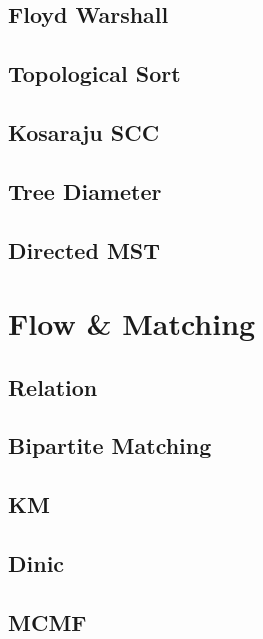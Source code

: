     \subsection{Floyd Warshall}
        
    \subsection{Topological Sort}
        
    \subsection{Kosaraju SCC}
        
    \subsection{Tree Diameter}
        
    \subsection{Directed MST}
        

\section{Flow \& Matching}
    \subsection{Relation}
        
    \subsection{Bipartite Matching}
        
    \subsection{KM}
        
    \subsection{Dinic}
        
    \subsection{MCMF}
        

